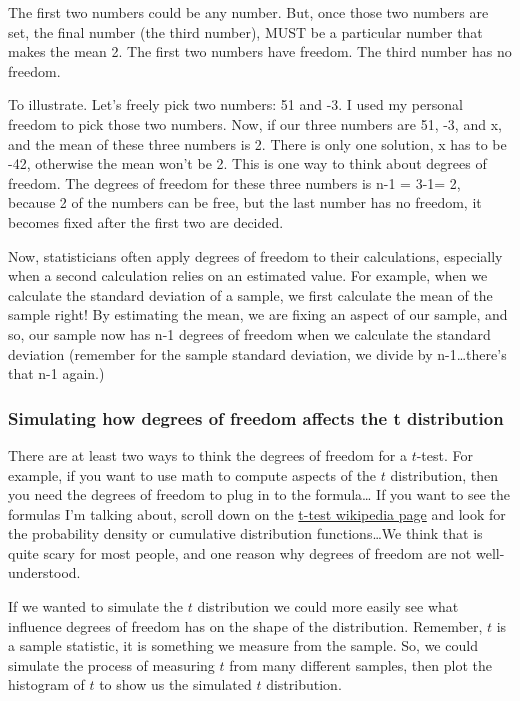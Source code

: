 \documentclass[
]{book}
\begin{document}
The first two numbers could be any number. But, once those two numbers are set, the final number (the third number), MUST be a particular number that makes the mean 2. The first two numbers have freedom. The third number has no freedom.

To illustrate. Let's freely pick two numbers: 51 and -3. I used my personal freedom to pick those two numbers. Now, if our three numbers are 51, -3, and x, and the mean of these three numbers is 2. There is only one solution, x has to be -42, otherwise the mean won't be 2. This is one way to think about degrees of freedom. The degrees of freedom for these three numbers is n-1 = 3-1= 2, because 2 of the numbers can be free, but the last number has no freedom, it becomes fixed after the first two are decided.

Now, statisticians often apply degrees of freedom to their calculations, especially when a second calculation relies on an estimated value. For example, when we calculate the standard deviation of a sample, we first calculate the mean of the sample right! By estimating the mean, we are fixing an aspect of our sample, and so, our sample now has n-1 degrees of freedom when we calculate the standard deviation (remember for the sample standard deviation, we divide by n-1\ldots there's that n-1 again.)

\subsubsection{Simulating how degrees of freedom affects the t distribution}\label{simulating-how-degrees-of-freedom-affects-the-t-distribution}

There are at least two ways to think the degrees of freedom for a \(t\)-test. For example, if you want to use math to compute aspects of the \(t\) distribution, then you need the degrees of freedom to plug in to the formula\ldots{} If you want to see the formulas I'm talking about, scroll down on the \href{https://en.wikipedia.org/wiki/Student\%27s_t-distribution}{t-test wikipedia page} and look for the probability density or cumulative distribution functions\ldots We think that is quite scary for most people, and one reason why degrees of freedom are not well-understood.

If we wanted to simulate the \(t\) distribution we could more easily see what influence degrees of freedom has on the shape of the distribution. Remember, \(t\) is a sample statistic, it is something we measure from the sample. So, we could simulate the process of measuring \(t\) from many different samples, then plot the histogram of \(t\) to show us the simulated \(t\) distribution.
\end{document}
